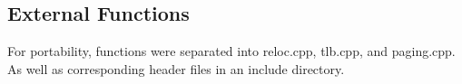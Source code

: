\begin{multicols}{2}
\subsection{External Functions}
For portability, functions were separated into reloc.cpp, tlb.cpp, and paging.cpp. As well as corresponding header files in an include directory.


\end{multicols}

